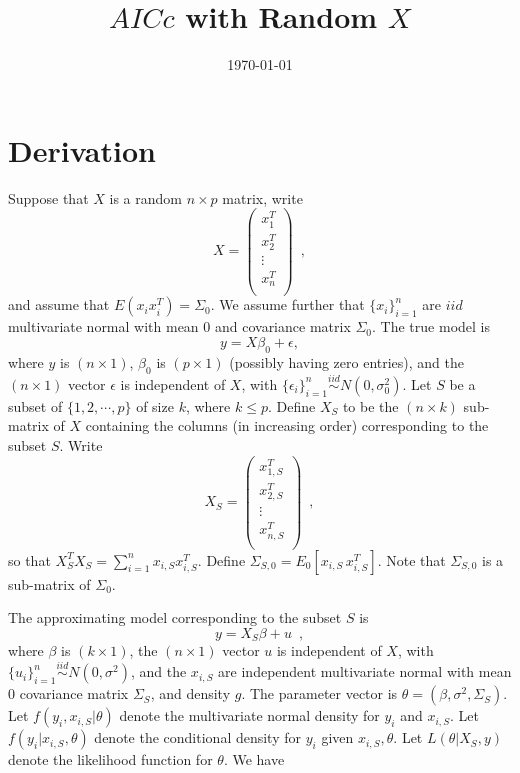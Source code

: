 \documentclass[11pt]{article}
\renewcommand{\baselinestretch}{1.9}
\begin{document}
{\renewcommand{\baselinestretch}{1.5}
\begin{titlepage}
    \title{
    \vspace{0in}
    \Large \textbf {$AICc$ with Random $X$}
    \vspace{.05in}}
    \date{\normalsize \today}
\end{titlepage}
\maketitle

\section{Derivation}
Suppose that $X$ is a random $n \times p$ matrix, write
\[
X=
\left(
    \begin{array}{c}
      x_1^T \\
      x_2^T \\
      \vdots \\
      x_n^T \\
    \end{array}
  \right) \,\,\, ,
\]
and assume that $E(x_ix_i^T) = \Sigma_0$. We assume further that $\{x_i\}_{i=1}^n$ are $iid$ multivariate normal with mean $0$ and covariance matrix $\Sigma_0$.
The true model is
\begin{equation}
y=X \beta_0 + \epsilon ,
\label{eq:truemodel}
\end{equation}
where $y$ is $(n \times 1)$, $\beta_0$ is $(p \times 1)$ (possibly having zero entries), and the $(n \times 1)$ vector $\epsilon$ is independent of $X$, with $\{\epsilon_i\}_{i=1}^n \stackrel {iid} {\sim} N(0,\sigma_0^2)$.
Let $S$ be a subset of $\{1,2,\cdots,p\}$ of size $k$, where $k \leq p$. Define $X_S$ to be the $(n \times k)$ sub-matrix of $X$ containing the columns (in increasing order) corresponding to the subset $S$. Write
\[
X_S=
\left(
    \begin{array}{c}
      x_{1,S}^T \\
      x_{2,S}^T \\
      \vdots \\
      x_{n,S}^T \\
    \end{array}
  \right) \,\,\, ,
\]
so that $X_S^T X_S = \sum_{i=1}^n x_{i,S} x_{i,S}^T$. Define $\Sigma_{S,0} = E_0[x_{i,S} \, x_{i,S}^T]$. Note that $\Sigma_{S,0}$ is a sub-matrix of $\Sigma_0$.

The approximating model corresponding to the subset $S$ is
\[
y=X_S \beta + u \,\,\, ,
\]
where $\beta$ is $(k \times 1)$, the $(n \times 1)$ vector $u$ is independent of $X$, with $\{u_i\}_{i=1}^n \stackrel {iid} {\sim} N(0,\sigma^2)$, and
the $x_{i,S}$ are independent multivariate normal with mean $0$ covariance matrix $\Sigma_S$, and density $g$.
The parameter vector is $\theta = (\beta,\sigma^2,\Sigma_S)$. Let $f(y_i,x_{i,S}|\theta)$ denote the multivariate normal density for $y_i$ and $x_{i,S}$. Let $f(y_i|x_{i,S},\theta)$ denote the conditional density for $y_i$ given $x_{i,S},\theta$. Let $L(\theta|{X_S,y})$ denote the likelihood function for $\theta$. We have

}
\end{document}
